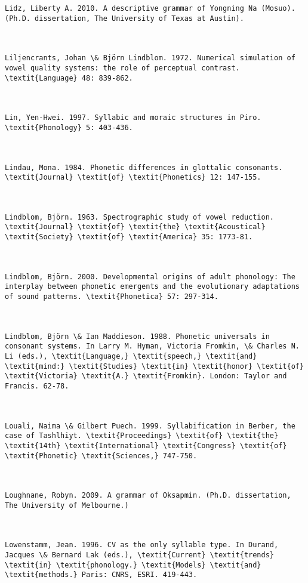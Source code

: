 \begin{verbatim}
Lidz, Liberty A. 2010. A descriptive grammar of Yongning Na (Mosuo). (Ph.D. dissertation, The University of Texas at Austin).



Liljencrants, Johan \& Björn Lindblom. 1972. Numerical simulation of vowel quality systems: the role of perceptual contrast. \textit{Language} 48: 839-862.



Lin, Yen-Hwei. 1997. Syllabic and moraic structures in Piro. \textit{Phonology} 5: 403-436.



Lindau, Mona. 1984. Phonetic differences in glottalic consonants. \textit{Journal} \textit{of} \textit{Phonetics} 12: 147-155.



Lindblom, Björn. 1963. Spectrographic study of vowel reduction. \textit{Journal} \textit{of} \textit{the} \textit{Acoustical} \textit{Society} \textit{of} \textit{America} 35: 1773-81.



Lindblom, Björn. 2000. Developmental origins of adult phonology: The interplay between phonetic emergents and the evolutionary adaptations of sound patterns. \textit{Phonetica} 57: 297-314.



Lindblom, Björn \& Ian Maddieson. 1988. Phonetic universals in consonant systems. In Larry M. Hyman, Victoria Fromkin, \& Charles N. Li (eds.), \textit{Language,} \textit{speech,} \textit{and} \textit{mind:} \textit{Studies} \textit{in} \textit{honor} \textit{of} \textit{Victoria} \textit{A.} \textit{Fromkin}. London: Taylor and Francis. 62-78.



Louali, Naima \& Gilbert Puech. 1999. Syllabification in Berber, the case of Tashlhiyt. \textit{Proceedings} \textit{of} \textit{the} \textit{14th} \textit{International} \textit{Congress} \textit{of} \textit{Phonetic} \textit{Sciences,} 747-750.



Loughnane, Robyn. 2009. A grammar of Oksapmin. (Ph.D. dissertation, The University of Melbourne.)



Lowenstamm, Jean. 1996. CV as the only syllable type. In Durand, Jacques \& Bernard Lak (eds.), \textit{Current} \textit{trends} \textit{in} \textit{phonology.} \textit{Models} \textit{and} \textit{methods.} Paris: CNRS, ESRI. 419-443.




\end{verbatim}
